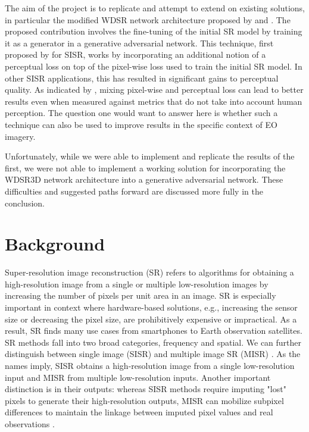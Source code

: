 \documentclass{article}
\begin{document}
The aim of the project is to replicate and attempt to extend on existing solutions, in particular the modified WDSR network architecture proposed by\citet{Dorr2020} and \citet{mark_bajo_2020_3733116}. The proposed contribution involves the fine-tuning of the initial SR model by training it as a generator in a generative adversarial network. This technique, first proposed by \citet{Ledig2016} for SISR, works by incorporating an additional notion of a perceptual loss on top of the pixel-wise loss used to train the initial SR model. In other SISR applications, this has resulted in significant gains to perceptual quality. As indicated by \citet{Zhao2017}, mixing pixel-wise and perceptual loss can lead to better results even when measured against metrics that do not take into account human perception. The question one would want to answer here is whether such a technique can also be used to improve results in the specific context of EO imagery.

Unfortunately, while we were able to implement and replicate the results of the first, we were not able to implement a working solution for incorporating the WDSR3D network architecture into a generative adversarial network. These difficulties and suggested paths forward are discussed more fully in the conclusion.

\section{Background}

Super-resolution image reconstruction (SR) refers to algorithms for obtaining a high-resolution image from a single or multiple low-resolution images by increasing the number of pixels per unit area in an image. SR is especially important in context where hardware-based solutions, e.g., increasing the sensor size or decreasing the pixel size, are prohibitively expensive or impractical. As a result, SR finds many use cases from smartphones to Earth observation satellites. SR methods fall into two broad categories, frequency and spatial. We can further distinguish between single image (SISR) and multiple image SR (MISR) \citep{Nasrollahi2014}. As the names imply, SISR obtains a high-resolution image from a single low-resolution input and MISR from multiple low-resolution inputs. Another important distinction is in their outputs: whereas SISR methods require imputing "lost" pixels to generate their high-resolution outputs, MISR can mobilize subpixel differences to maintain the linkage between imputed pixel values and real observations \citep{Martens2021}.
\end{document}
